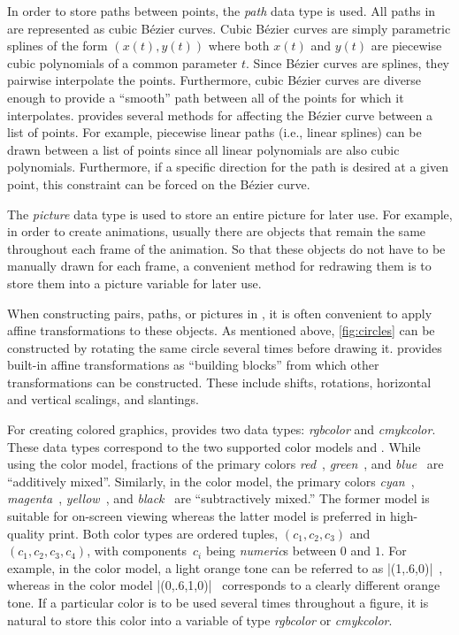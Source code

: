 In order to store paths between points, the \textit{path} data type is
used.  All paths in \MP{} are represented as cubic B\'{e}zier curves.
Cubic B\'{e}zier curves are simply parametric splines of the form
$(x(t),y(t))$ where both $x(t)$ and $y(t)$ are piecewise cubic
polynomials of a common parameter $t$.  Since B\'{e}zier curves are
splines, they pairwise interpolate the points.  Furthermore, cubic
B\'{e}zier curves are diverse enough to provide a ``smooth'' path
between all of the points for which it interpolates.  \MP{} provides
several methods for affecting the B\'{e}zier curve between a list of
points.  For example, piecewise linear paths (i.e., linear splines) can
be drawn between a list of points since all linear polynomials are also
cubic polynomials.  Furthermore, if a specific direction for the path is
desired at a given point, this constraint can be forced on the
B\'{e}zier curve.

The \textit{picture} data type is used to store an entire picture for
later use.  For example, in order to create animations, usually there
are objects that remain the same throughout each frame of the animation.
So that these objects do not have to be manually drawn for each frame, a
convenient method for redrawing them is to store them into a picture
variable for later use.

When constructing pairs, paths, or pictures in \MP{}, it is often
convenient to apply affine transformations to these objects.  As
mentioned above, \autoref{fig:circles} can be constructed by rotating
the same circle several times before drawing it.  \MP{} provides
built-in affine transformations as ``building blocks'' from which other
transformations can be constructed.  These include shifts, rotations,
horizontal and vertical scalings, and slantings.

For creating colored graphics, \MP{} provides two data types:
\textit{rgbcolor} and \textit{cmykcolor}.  These data types correspond
to the two supported color models \RGB{} and \CMYK.  While using the
\RGB{} color model, fractions of the primary colors
\textit{red}~, \textit{green}~, and
\textit{blue}~ are ``additively mixed''.  Similarly, in
the \CMYK{} color model, the primary colors
\textit{cyan}~, \textit{magenta}~,
\textit{yellow}~, and \textit{black}~ are
``subtractively mixed.''  The former model is suitable for on-screen
viewing whereas the latter model is preferred in high-quality print.
Both color types are ordered tuples, $(c_1,c_2,c_3)$ and
$(c_1,c_2,c_3,c_4)$, with components~$c_i$ being \textit{numeric}s
between $0$ and $1$.  For example, in the \RGB{} color model, a light
orange tone can be referred to as
|(1,.6,0)|~, whereas in the
\CMYK{} color model
|(0,.6,1,0)|~ corresponds to
a clearly different orange tone.  If a particular color is to be used
several times throughout a figure, it is natural to store this color
into a variable of type \textit{rgbcolor} or \textit{cmykcolor}.

